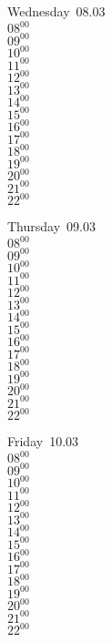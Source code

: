 \documentclass[11pt,a4paper]{book}\usepackage[]{graphicx}\usepackage[]{color}
\begin{document}
\begin{weekdaybox}
  Wednesday~08.03\\
  { 
  \vfill
  $08^{00}$\\
$09^{00}$\\
$10^{00}$\\
$11^{00}$\\
$12^{00}$\\
$13^{00}$\\
$14^{00}$\\
$15^{00}$\\
$16^{00}$\\
$17^{00}$\\
$18^{00}$\\
$19^{00}$\\
$20^{00}$\\
$21^{00}$\\
$22^{00}$\\
  }
\end{weekdaybox}
\clearpage
\begin{headerbox}
\end{headerbox}
\begin{weekdaybox}
  Thursday~09.03\\
  { 
  \vfill
  $08^{00}$\\
$09^{00}$\\
$10^{00}$\\
$11^{00}$\\
$12^{00}$\\
$13^{00}$\\
$14^{00}$\\
$15^{00}$\\
$16^{00}$\\
$17^{00}$\\
$18^{00}$\\
$19^{00}$\\
$20^{00}$\\
$21^{00}$\\
$22^{00}$\\
  }
\end{weekdaybox} 
\begin{weekdaybox}
  Friday~10.03\\
  { 
  \vfill
  $08^{00}$\\
$09^{00}$\\
$10^{00}$\\
$11^{00}$\\
$12^{00}$\\
$13^{00}$\\
$14^{00}$\\
$15^{00}$\\
$16^{00}$\\
$17^{00}$\\
$18^{00}$\\
$19^{00}$\\
$20^{00}$\\
$21^{00}$\\
$22^{00}$\\
  }
\end{weekdaybox}
\end{document}
